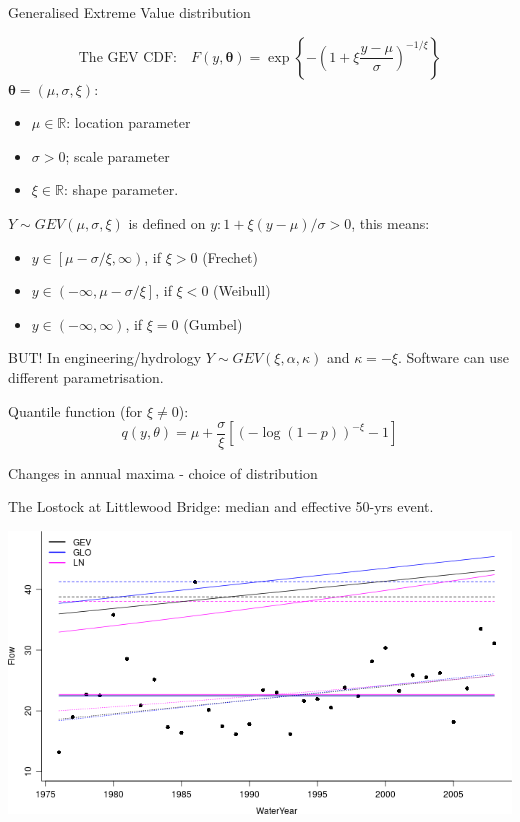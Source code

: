 \documentclass[
  10pt,
  ignorenonframetext,
  compress]{beamer}
\providecommand{\tightlist}{%
  \setlength{\itemsep}{0pt}\setlength{\parskip}{0pt}}
\begin{document}
\begin{frame}{Generalised Extreme Value distribution}
\protect\hypertarget{generalised-extreme-value-distribution}{}

\[ \text{The GEV CDF:} \quad F(y, \boldsymbol \theta) =  \exp\left\{ -\left( 1 + \xi \frac{y-\mu}{\sigma} \right) ^{-1/\xi} \right\}\]
\(\boldsymbol\theta = (\mu, \sigma, \xi)\):

\begin{itemize}
\tightlist
\item
  \(\mu \in \mathbb{R}\): location parameter
\item
  \(\sigma > 0\); scale parameter
\item
  \(\xi \in \mathbb{R}\): shape parameter.
\end{itemize}

\(Y \sim GEV(\mu, \sigma,\xi)\) is defined on
\({y: 1 + \xi (y - \mu)/\sigma > 0}\), this means:

\begin{itemize}
\tightlist
\item
  \(y \in \left[ \mu -\sigma/\xi, \infty \right)\), if \(\xi > 0\)
  (Frechet)
\item
  \(y \in \left( -\infty, \mu -\sigma/\xi \right]\), if \(\xi < 0\)
  (Weibull)
\item
  \(y \in \left( -\infty, \infty \right)\), if \(\xi = 0\) (Gumbel)
\end{itemize}

BUT! In engineering/hydrology \(Y \sim GEV(\xi, \alpha, \kappa)\) and
\(\kappa = -\xi\). Software can use different parametrisation.

\pause

Quantile function (for \(\xi \neq 0\)):
\[q(y, \theta) = \mu + \frac{\sigma}{\xi} \left[(-\log(1-p))^{-\xi} -1 \right] \]

\end{frame}

\begin{frame}{Changes in annual maxima - choice of distribution}
\protect\hypertarget{changes-in-annual-maxima---choice-of-distribution}{}

The Lostock at Littlewood Bridge: median and effective 50-yrs event.

\includegraphics{ProsdocimiPerugia_files/figure-beamer/allRetsPlots-1.png}

\end{frame}
\end{document}
